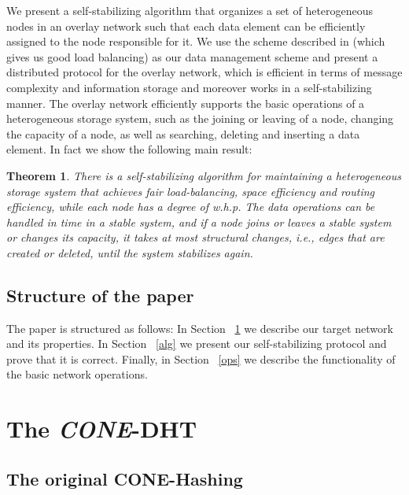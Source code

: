 \documentclass[11pt]{article}
\newtheorem{theorem}{Theorem}[section]
\begin{document}
We present a self-stabilizing algorithm that organizes a set of heterogeneous
nodes in an overlay network such that each data element can be efficiently
assigned to the node responsible for it. We use the scheme described in
\cite{cone} (which gives us good load balancing) as our data management scheme
and present a distributed protocol for the overlay network, which is efficient
in terms of message complexity and information storage and moreover works in a
self-stabilizing manner. The overlay network efficiently supports the basic
operations of a heterogeneous storage system, such as the joining or leaving
of a node, changing the capacity of a node, as well as searching, deleting and
inserting a data element. In fact we show the following main result:

\begin{theorem}\label{theo:main}
There is a self-stabilizing algorithm for maintaining a heterogeneous storage
system that achieves fair load-balancing, space efficiency and routing
efficiency, while each node has a degree of  w.h.p. The
data operations can be handled in  time in a stable system, and if
a node joins or leaves a stable system or changes its capacity, it takes at
most  structural changes, i.e., edges that are created
or deleted, until the system stabilizes again.
\end{theorem}

\subsection{Structure of the paper}

The paper is structured as follows: In Section ~\ref{cone-dht} we describe our target network and its properties.
In Section ~\ref{alg} we present our self-stabilizing protocol and prove that
it is correct. Finally, in Section ~\ref{ops} we describe the functionality of
the basic network operations.





\section{The \emph{CONE}-DHT}\label{cone-dht}


\subsection{The original CONE-Hashing}
\end{document}
